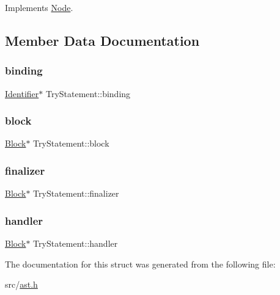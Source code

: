 Implements \hyperlink{struct_node_a82f29420d0a38efcc370352528e94e9b}{Node}.



\subsection{Member Data Documentation}
\mbox{\label{struct_try_statement_aa34bf615eed7785f87cd063a562ad8c7}} 
\subsubsection{\texorpdfstring{binding}{binding}}
{\footnotesize\ttfamily \hyperlink{struct_identifier}{Identifier}$\ast$ Try\+Statement\+::binding}

\mbox{\label{struct_try_statement_aeea1fa5fce0062d0f8d427d4706d1f73}} 
\subsubsection{\texorpdfstring{block}{block}}
{\footnotesize\ttfamily \hyperlink{struct_block}{Block}$\ast$ Try\+Statement\+::block}

\mbox{\label{struct_try_statement_a95cbb6dbd527aad85fa40f0b8b98b66c}} 
\subsubsection{\texorpdfstring{finalizer}{finalizer}}
{\footnotesize\ttfamily \hyperlink{struct_block}{Block}$\ast$ Try\+Statement\+::finalizer}

\mbox{\label{struct_try_statement_a4d97ad90948102f8e6dca2051f03ceb0}} 
\subsubsection{\texorpdfstring{handler}{handler}}
{\footnotesize\ttfamily \hyperlink{struct_block}{Block}$\ast$ Try\+Statement\+::handler}



The documentation for this struct was generated from the following file\+:\begin{DoxyCompactItemize}
\item 
src/\hyperlink{ast_8h}{ast.\+h}\end{DoxyCompactItemize}
